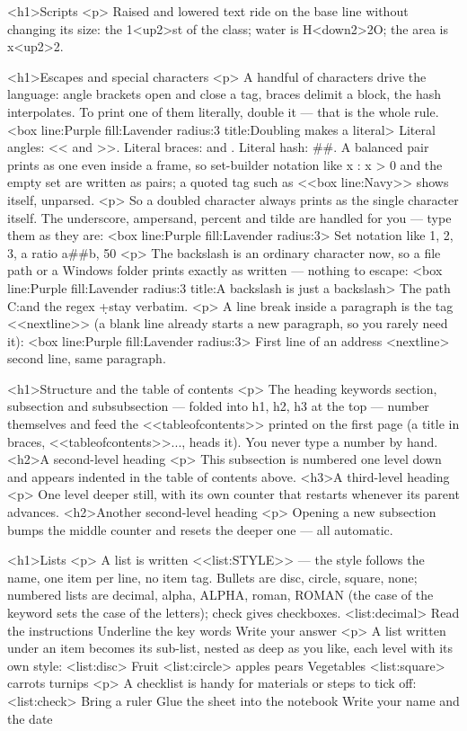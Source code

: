 \documentclass[
margins=20,
font=Latin Modern Roman,
size=12,
lang=en
]{scholatex}
\begin{document}
	<h1>Scripts
	<p>{
		Raised and lowered text ride on the base line without changing its size:
		the 1<up2>{st} of the class; water is H<down2>{2}O; the area is
		x<up2>{2}.
	}
	
	<h1>Escapes and special characters
	<p>{
		A handful of characters drive the language: angle brackets open and close
		a tag, braces delimit a block, the hash interpolates. To print one of them
		literally, double it — that is the whole rule.
	}
	<box line:Purple fill:Lavender radius:3 title:{Doubling makes a literal}>{
		Literal angles: << and >>. Literal braces: {{ and }}. Literal hash: ##.
		A balanced pair prints as one even inside a frame, so set-builder
		notation like {{ x : x > 0 }} and the empty set {{}} are written as
		pairs; a quoted tag such as <<box line:Navy>> shows itself, unparsed.
	}
	<p>{
		So a doubled character always prints as the single character itself. The
		underscore, ampersand, percent and tilde are handled for you — type them
		as they are:
	}
	<box line:Purple fill:Lavender radius:3>{
		Set notation like {{1, 2, 3}}, a ratio a##b, 50%
	}
	<p>{
		The backslash is an ordinary character now, so a file path or a Windows
		folder prints exactly as written — nothing to escape:
	}
	<box line:Purple fill:Lavender radius:3 title:{A backslash is just a backslash}>{
		The path C:\Users\Leo\Documents and the regex \d+\s*\w stay verbatim.
	}
	<p>{
		A line break inside a paragraph is the tag <<nextline>> (a blank line
		already starts a new paragraph, so you rarely need it):
	}
	<box line:Purple fill:Lavender radius:3>{
		First line of an address <nextline> second line, same paragraph.
	}
	
	<h1>Structure and the table of contents
	<p>{
		The heading keywords section, subsection and
		subsubsection — folded into h1, h2, h3 at the top —
		number themselves and feed the <<tableofcontents>> printed on the first page
		(a title in braces, <<tableofcontents>>{...}, heads it). You never type a
		number by hand.
	}
	<h2>A second-level heading
	<p>{
		This subsection is numbered one level down and appears indented in the
		table of contents above.
	}
	<h3>A third-level heading
	<p>{
		One level deeper still, with its own counter that restarts whenever its
		parent advances.
	}
	<h2>Another second-level heading
	<p>{
		Opening a new subsection bumps the middle counter and resets the deeper
		one — all automatic.
	}
	
	<h1>Lists
	<p>{
		A list is written <<list:STYLE>> — the style follows the name, one
		item per line, no item tag. Bullets are disc, circle,
		square, none; numbered lists are decimal, alpha,
		ALPHA, roman, ROMAN (the case of the keyword sets the
		case of the letters); check gives checkboxes.
	}
	<list:decimal>{
		Read the instructions
		Underline the key words
		Write your answer
	}
	<p>{
		A list written under an item becomes its sub-list, nested as deep as you
		like, each level with its own style:
	}
	<list:disc>{
		Fruit
		<list:circle>{
			apples
			pears
		}
		Vegetables
		<list:square>{
			carrots
			turnips
		}
	}
	<p>{
		A checklist is handy for materials or steps to tick off:
	}
	<list:check>{
		Bring a ruler
		Glue the sheet into the notebook
		Write your name and the date
	}
	
\end{document}
